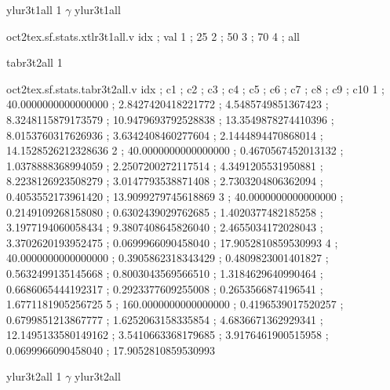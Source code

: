 \expandafter\def\csname oct2tex.sf.stats.ylur3t1all.t\endcsname{ylur3t1all}
\expandafter\def\csname oct2tex.sf.stats.ylur3t1all.u\endcsname{1}
\expandafter\def\csname oct2tex.sf.stats.ylur3t1all.v\endcsname{$\gamma$}
\expandafter\def\csname oct2tex.sf.stats.xtlr3t1all.t\endcsname{ylur3t1all}
\begin{filecontents}[overwrite]{oct2tex.sf.stats.xtlr3t1all.v}
idx ; val
1 ; 25
2 ; 50
3 ; 70
4 ; all
\end{filecontents}
\expandafter\def\csname oct2tex.sf.stats.tabr3t2all.t\endcsname{tabr3t2all}
\expandafter\def\csname oct2tex.sf.stats.tabr3t2all.u\endcsname{1}
\begin{filecontents}[overwrite]{oct2tex.sf.stats.tabr3t2all.v}
idx ; c1 ; c2 ; c3 ; c4 ; c5 ; c6 ; c7 ; c8 ; c9 ; c10
1 ; 40.0000000000000000 ; 2.8427420418221772 ; 4.5485749851367423 ; 8.3248115879173579 ; 10.9479693792528838 ; 13.3549878274410396 ; 8.0153760317626936 ; 3.6342408460277604 ; 2.1444894470868014 ; 14.1528526212328636
2 ; 40.0000000000000000 ; 0.4670567452013132 ; 1.0378888368994059 ; 2.2507200272117514 ; 4.3491205531950881 ; 8.2238126923508279 ; 3.0147793538871408 ; 2.7303204806362094 ; 0.4053552173961420 ; 13.9099279745618869
3 ; 40.0000000000000000 ; 0.2149109268158080 ; 0.6302439029762685 ; 1.4020377482185258 ; 3.1977194060058434 ; 9.3807408645826040 ; 2.4655034172028043 ; 3.3702620193952475 ; 0.0699966090458040 ; 17.9052810859530993
4 ; 40.0000000000000000 ; 0.3905862318343429 ; 0.4809823001401827 ; 0.5632499135145668 ; 0.8003043569566510 ; 1.3184629640990464 ; 0.6686065444192317 ; 0.2923377609255008 ; 0.2653566874196541 ; 1.6771181905256725
5 ; 160.0000000000000000 ; 0.4196539017520257 ; 0.6799851213867777 ; 1.6252063158335854 ; 4.6836671362929341 ; 12.1495133580149162 ; 3.5410663368179685 ; 3.9176461900515958 ; 0.0699966090458040 ; 17.9052810859530993
\end{filecontents}
\expandafter\def\csname oct2tex.sf.stats.ylur3t2all.t\endcsname{ylur3t2all}
\expandafter\def\csname oct2tex.sf.stats.ylur3t2all.u\endcsname{1}
\expandafter\def\csname oct2tex.sf.stats.ylur3t2all.v\endcsname{$\gamma$}
\expandafter\def\csname oct2tex.sf.stats.xtlr3t2all.t\endcsname{ylur3t2all}
